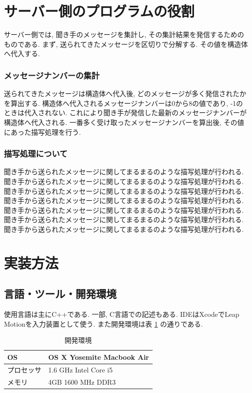 \documentclass{funthesis}
\begin{document}
\section{サーバー側のプログラムの役割}

サーバー側では, 聞き手のメッセージを集計し,  その集計結果を発信するためのものである.
まず, 送られてきたメッセージを区切りで分解する. その値を構造体へ代入する. 
\subsubsection{メッセージナンバーの集計}
送られてきたメッセージは構造体へ代入後, どのメッセージが多く発信されたかを算出する. 構造体へ代入されるメッセージナンバーは0から8の値であり, -1のときは代入されない. これにより聞き手が発信した最新のメッセージナンバーが構造体へ代入される. 一番多く受け取ったメッセージナンバーを算出後, その値にあった描写処理を行う.  

\subsubsection{描写処理について}
聞き手から送られたメッセージに関してまるまるのような描写処理が行われる.聞き手から送られたメッセージに関してまるまるのような描写処理が行われる.聞き手から送られたメッセージに関してまるまるのような描写処理が行われる.聞き手から送られたメッセージに関してまるまるのような描写処理が行われる.聞き手から送られたメッセージに関してまるまるのような描写処理が行われる.聞き手から送られたメッセージに関してまるまるのような描写処理が行われる.聞き手から送られたメッセージに関してまるまるのような描写処理が行われる.


\section{実装方法}

\subsection{言語・ツール・開発環境}
使用言語は主にC++である. 一部, C言語での記述もある. IDEはXcodeでLeap Motionを入力装置として使う. また開発環境は表 \ref{env} の通りである. 

\begin{table}[H]
\begin{center}
\caption{開発環境}
  \begin{tabular}{ll}
  
   \hline
OS & OS X  Yosemite Macbook Air \\ 
  \hline
プロセッサ & 1.6 GHz Intel Core i5\\ 
  \hline
メモリ & 4GB 1600 MHz DDR3\\ 
  \hline
  \end{tabular}
  \label{env}
  \end{center}
\end{table}
\end{document}
